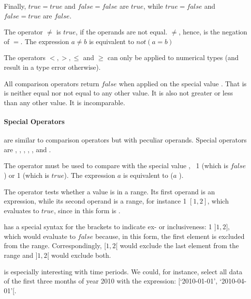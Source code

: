 Finally, $true = true$ and
$false = false$ are $true$, while
$true = false$ and $false = true$ are
$false$.

The operator $\neq$ is $true$,
if the operands are not equal.
$\neq$, hence, is the negation
of $=$. The expression $a\neq b$ is equivalent to
$not (a=b)$

The  operators
$<,>,\le$ and $\ge$ can only be applied
to numerical types (and result in a
type error otherwise).

All comparison operators return $false$
when applied on the special value .
That is  is neither equal nor
not equal to any other value. It is also
not greater or less than any other value.
It is incomparable. 

\paragraph{Special Operators}
are similar to comparison operators
but with peculiar operands.
Special operators are
,
,
,
,
,
 and
.


The operator  must be used
to compare with the special value
, \eg\ 1 
(which is $false$) 
or 1 
(which is $true$).
The expression
$a$  is
equivalent to
($a$ ).

The operator  tests
whether a value is in a range.
Its first operand is an expression,
while its second operand is a range,
for instance
1  $[1,2]$,
which evaluates to $true$,
since  in this form is
.

 has a special syntax
for the brackets to indicate
ex- or inclusiveness:
1  $]1,2]$,
which would evaluate to $false$
because, in this form, the first
element is excluded from the range.
Correspondingly,
 $[1,2[$
would exclude the last element from the range
and
 $]1,2[$
would exclude both.

 is especially interesting
with time periods. We could, for instance,
select all data of the first three months
of year 2010 with the expression:
 
[`2010-01-01', `2010-04-01'[.

